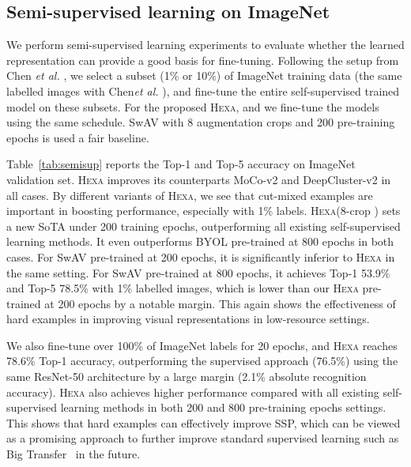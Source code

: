 \documentclass[10pt,twocolumn,letterpaper]{article}
\newcommand{\ea}[0]{\emph{et al. }}
\newcommand{\shortname}{\textsc{Hexa}}
\begin{document}
\subsection{Semi-supervised learning on ImageNet}

We perform semi-supervised learning experiments to evaluate whether the learned representation can provide a good basis for fine-tuning. Following the setup from Chen \ea\cite{chen2020simple}, we select a subset (1\% or 10\%) of ImageNet training data (the same labelled images with Chen\ea\cite{chen2020simple}),
and fine-tune the entire self-supervised trained model on these subsets.
For the proposed \shortname{}, and  we fine-tune the models using the same schedule. SwAV with 8 augmentation crops and 200 pre-training epochs is used a fair baseline.

Table~\ref{tab:semisup} reports the Top-1 and Top-5 accuracy on ImageNet validation set. \shortname{} improves its counterparts MoCo-v2 and DeepCluster-v2 in all cases. By different variants of  \shortname{}, we see that cut-mixed examples are important in boosting performance, especially with 1\% labels. 
\shortname{}(8-crop \!) sets a new SoTA under 200 training epochs, outperforming all existing self-supervised learning methods. 
It even outperforms BYOL pre-trained at 800 epochs in both cases.
For SwAV pre-trained at 200 epochs, it is significantly inferior to \shortname{} in the same setting.
For SwAV pre-trained at 800 epochs, it achieves Top-1 53.9\% and Top-5 78.5\% with 1\% labelled images, which is lower than our \shortname{} pre-trained at 200 epochs by a notable margin. This again shows the effectiveness of hard examples in improving visual representations in low-resource settings. 

We also fine-tune over 100\% of ImageNet labels for 20 epochs, and \shortname{} reaches 78.6\% Top-1 accuracy, outperforming the supervised approach (76.5\%) using the same ResNet-50 architecture by a large margin (2.1\% absolute recognition accuracy). \shortname{} also achieves higher performance compared with all existing self-supervised learning methods in both 200 and 800 pre-training epochs settings. This shows that hard examples can effectively improve SSP, which can be viewed as a promising approach to further improve standard supervised learning such as Big Transfer~\cite{kolesnikov2019big} in the future.
\end{document}
